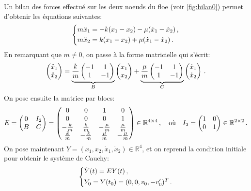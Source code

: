 \noindent Un bilan des forces effectué sur les deux noeuds du floe (voir \cref{fig:bilan0}) permet d'obtenir les équations suivantes:
\begin{align}
    \begin{dcases}
    m\ddot x_1 = - k(x_1 - x_2) - \mu(\dot x_1 - \dot x_2) \,,\\
        m \ddot x_2 =  k(x_1 - x_2) + \mu(\dot x_1 - \dot x_2) \,. 
    \end{dcases}
\end{align}
En remarquant que $m\neq 0$, on passe à la forme matricielle qui s'écrit:
\begin{align}
    \begin{pmatrix} \ddot{x}_1 \\ \ddot{x}_2 \end{pmatrix} = 
      \underbrace{ \frac{k}{m} \begin{pmatrix} -1 & 1 \\ 1 & -1 \end{pmatrix}}_{B} \begin{pmatrix} x_1 \\ x_2 \end{pmatrix}
    + \underbrace{\frac{\mu}{m} \begin{pmatrix} -1 & 1 \\ 1 & -1 \end{pmatrix}}_{C} \begin{pmatrix} \dot{x}_1 \\ \dot{x}_2 \end{pmatrix} \,.
\end{align}
On pose ensuite la matrice par blocs:
\[ E = \begin{pmatrix} 0 & I_2 \\ B & C \end{pmatrix}  =  \begin{pmatrix}
    0 & 0 & 1 & 0 \\ 0 & 0& 0& 1 \\ -\frac{k}{m} & \frac{k}{m} & -\frac{\mu}{m} & \frac{\mu}{m} \\ \frac{k}{m} & -\frac{k}{m} & \frac{\mu}{m} & -\frac{\mu}{m}
\end{pmatrix}   \in \mathbb{R}^{4\times 4} \,, \quad \text{où} \quad I_2 = \begin{pmatrix} 1 & 0 \\ 0 & 1 \end{pmatrix} \in \mathbb{R}^{2\times 2} \,. \]
On pose maintenant $Y = (x_1, x_2, \dot{x}_1, \dot{x}_2) \in \mathbb{R}^4$, et on reprend la condition initiale pour obtenir le système de Cauchy:
\begin{align} \label{eq:dep1d}
    \begin{dcases}
        \dot{Y}(t)= E Y(t) \,, \\
        Y_0 = Y(t_0) = (0,0,v_0,-v'_0)^T \,.
    \end{dcases}
\end{align}

